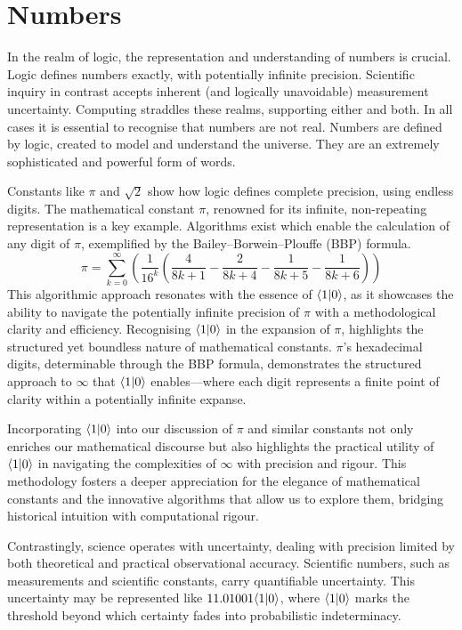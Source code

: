 \documentclass[12pt]{article}
\begin{document}
\section*{Numbers}

In the realm of logic, the representation and understanding of numbers is crucial. Logic defines numbers exactly, with potentially infinite precision. Scientific inquiry in contrast accepts inherent (and logically unavoidable) measurement uncertainty. Computing straddles these realms, supporting either and both. In all cases it is essential to recognise that numbers are not real. Numbers are defined by logic, created to model and understand the universe. They are an extremely sophisticated and powerful form of words.

Constants like \(\pi\) and \(\sqrt{2}\) show how logic defines complete precision, using endless digits. The mathematical constant \(\pi\), renowned for its infinite, non-repeating representation is a key example. Algorithms exist which enable the calculation of any digit of \(\pi\), exemplified by the Bailey–Borwein–Plouffe (BBP) formula.
\[ \pi = \sum_{k=0}^{\infty} \left( \frac{1}{16^k} \left( \frac{4}{8k + 1} - \frac{2}{8k + 4} - \frac{1}{8k + 5} - \frac{1}{8k + 6} \right) \right) \]
This algorithmic approach resonates with the essence of \(\langle 1 | 0 \rangle\), as it showcases the ability to navigate the potentially infinite precision of \(\pi\) with a methodological clarity and efficiency. Recognising \(\langle 1 | 0 \rangle\) in the expansion of \(\pi\), highlights the structured yet boundless nature of mathematical constants. \(\pi\)'s hexadecimal digits, determinable through the BBP formula, demonstrates the structured approach to \(\infty\) that \(\langle 1 | 0 \rangle\) enables—where each digit represents a finite point of clarity within a potentially infinite expanse.

Incorporating \(\langle 1 | 0 \rangle\) into our discussion of \(\pi\) and similar constants not only enriches our mathematical discourse but also highlights the practical utility of \(\langle 1 | 0 \rangle\) in navigating the complexities of \(\infty\) with precision and rigour. This methodology fosters a deeper appreciation for the elegance of mathematical constants and the innovative algorithms that allow us to explore them, bridging historical intuition with computational rigour.

Contrastingly, science operates with uncertainty, dealing with precision limited by both theoretical and practical observational accuracy. Scientific numbers, such as measurements and scientific constants, carry quantifiable uncertainty. This uncertainty may be represented like \(11.01001\langle 1 | 0 \rangle\), where \(\langle 1 | 0 \rangle\) marks the threshold beyond which certainty fades into probabilistic indeterminacy.
\end{document}
